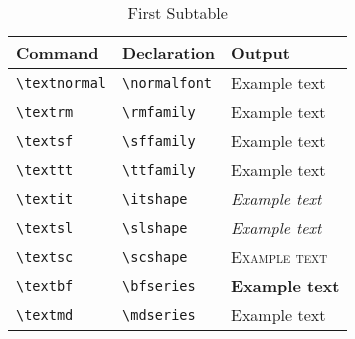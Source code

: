 \documentclass[a4paper]{article}
\begin{document}
\begin{table}[htp]
    \centering
    \begin{subtable}[htp]{0.5\textwidth}
        \centering
        \begin{tabular}{lll}
        \toprule[1.5pt]
        \textbf{Command} & \textbf{Declaration} & \textbf{Output}\\
        \midrule
        \verb|\textnormal| &\verb|\normalfont| & Example text\\
        \verb|\textrm| & \verb|\rmfamily| & \rmfamily Example text\\
        \verb|\textsf| & \verb|\sffamily| & \sffamily Example text\\
        \verb|\texttt| &\verb|\ttfamily| & \ttfamily Example text\\
        \verb|\textit| &\verb|\itshape| & \itshape Example text\\
        \verb|\textsl| &\verb|\slshape| & \slshape Example text\\
        \verb|\textsc| &\verb|\scshape| & \scshape Example text\\
        \verb|\textbf| &\verb|\bfseries| & \bfseries Example text\\
        \verb|\textmd| &\verb|\mdseries| & \mdseries Example text\\
        \bottomrule[1.5pt]
        \end{tabular}
      \caption{First Subtable}
      \label{tab:subtable-a}
    \end{subtable}
    

\end{table}
\end{document}

